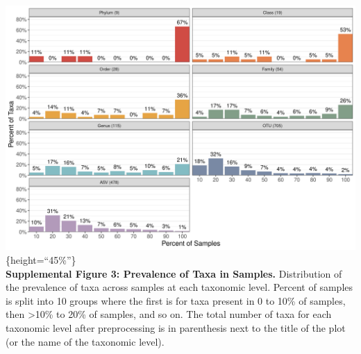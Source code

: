 \documentclass[]{article}
\begin{document}
\includegraphics{figure_s3.png}\{height=``45\%''\}\\\textbf{Supplemental
Figure 3: Prevalence of Taxa in Samples.} Distribution of the prevalence
of taxa across samples at each taxonomic level. Percent of samples is
split into 10 groups where the first is for taxa present in 0 to 10\% of
samples, then \textgreater{}10\% to 20\% of samples, and so on. The
total number of taxa for each taxonomic level after preprocessing is in
parenthesis next to the title of the plot (or the name of the taxonomic
level).

\newpage
\end{document}
